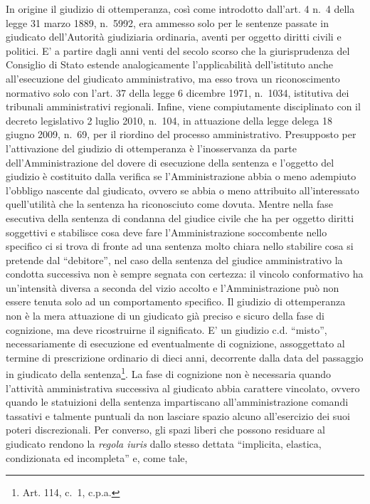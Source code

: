 \documentclass[12pt,it,a4paper,]{report}
\begin{document}
In origine il giudizio di ottemperanza, così come introdotto dall'art. 4
n.~4 della legge 31 marzo 1889, n.~5992, era ammesso solo per le
sentenze passate in giudicato dell'Autorità giudiziaria ordinaria,
aventi per oggetto diritti civili e politici. E' a partire dagli anni
venti del secolo scorso che la giurisprudenza del Consiglio di Stato
estende analogicamente l'applicabilità dell'istituto anche
all'esecuzione del giudicato amministrativo, ma esso trova un
riconoscimento normativo solo con l'art. 37 della legge 6 dicembre 1971,
n.~1034, istitutiva dei tribunali amministrativi regionali. Infine,
viene compiutamente disciplinato con il decreto legislativo 2 luglio
2010, n.~104, in attuazione della legge delega 18 giugno 2009, n.~69,
per il riordino del processo amministrativo. Presupposto per
l'attivazione del giudizio di ottemperanza è l'inosservanza da parte
dell'Amministrazione del dovere di esecuzione della sentenza e l'oggetto
del giudizio è costituito dalla verifica se l'Amministrazione abbia o
meno adempiuto l'obbligo nascente dal giudicato, ovvero se abbia o meno
attribuito all'interessato quell'utilità che la sentenza ha riconosciuto
come dovuta. Mentre nella fase esecutiva della sentenza di condanna del
giudice civile che ha per oggetto diritti soggettivi e stabilisce cosa
deve fare l'Amministrazione soccombente nello specifico ci si trova di
fronte ad una sentenza molto chiara nello stabilire cosa si pretende dal
``debitore'', nel caso della sentenza del giudice amministrativo la
condotta successiva non è sempre segnata con certezza: il vincolo
conformativo ha un'intensità diversa a seconda del vizio accolto e
l'Amministrazione può non essere tenuta solo ad un comportamento
specifico. Il giudizio di ottemperanza non è la mera attuazione di un
giudicato già preciso e sicuro della fase di cognizione, ma deve
ricostruirne il significato. E' un giudizio c.d. ``misto'',
necessariamente di esecuzione ed eventualmente di cognizione,
assoggettato al termine di prescrizione ordinario di dieci anni,
decorrente dalla data del passaggio in giudicato della
sentenza\footnote{Art. 114, c.~1, c.p.a.}. La fase di cognizione non è
necessaria quando l'attività amministrativa successiva al giudicato
abbia carattere vincolato, ovvero quando le statuizioni della sentenza
impartiscano all'amministrazione comandi tassativi e talmente puntuali
da non lasciare spazio alcuno all'esercizio dei suoi poteri
discrezionali. Per converso, gli spazi liberi che possono residuare al
giudicato rendono la \emph{regola iuris} dallo stesso dettata
``implicita, elastica, condizionata ed incompleta'' e, come tale,
\end{document}
